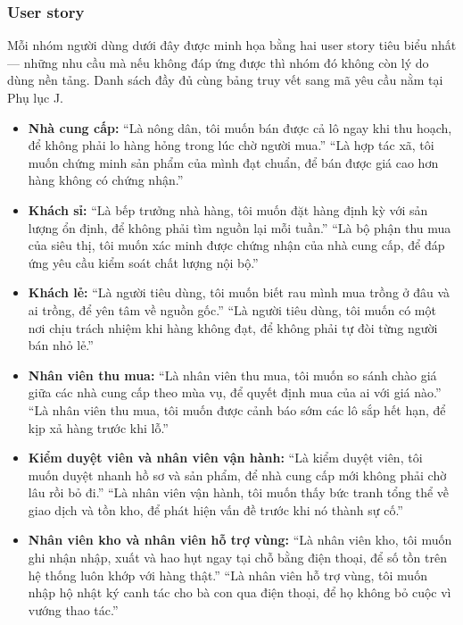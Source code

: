 \subsubsection*{User story}

Mỗi nhóm người dùng dưới đây được minh họa bằng hai user story tiêu biểu nhất --- những nhu cầu mà nếu không đáp ứng được thì nhóm đó không còn lý do dùng nền tảng. Danh sách đầy đủ cùng bảng truy vết sang mã yêu cầu nằm tại Phụ lục J.

\begin{itemize}
    \item \textbf{Nhà cung cấp:} ``Là nông dân, tôi muốn bán được cả lô ngay khi thu hoạch, để không phải lo hàng hỏng trong lúc chờ người mua.'' \quad ``Là hợp tác xã, tôi muốn chứng minh sản phẩm của mình đạt chuẩn, để bán được giá cao hơn hàng không có chứng nhận.''
    \item \textbf{Khách sỉ:} ``Là bếp trưởng nhà hàng, tôi muốn đặt hàng định kỳ với sản lượng ổn định, để không phải tìm nguồn lại mỗi tuần.'' \quad ``Là bộ phận thu mua của siêu thị, tôi muốn xác minh được chứng nhận của nhà cung cấp, để đáp ứng yêu cầu kiểm soát chất lượng nội bộ.''
    \item \textbf{Khách lẻ:} ``Là người tiêu dùng, tôi muốn biết rau mình mua trồng ở đâu và ai trồng, để yên tâm về nguồn gốc.'' \quad ``Là người tiêu dùng, tôi muốn có một nơi chịu trách nhiệm khi hàng không đạt, để không phải tự đòi từng người bán nhỏ lẻ.''
    \item \textbf{Nhân viên thu mua:} ``Là nhân viên thu mua, tôi muốn so sánh chào giá giữa các nhà cung cấp theo mùa vụ, để quyết định mua của ai với giá nào.'' \quad ``Là nhân viên thu mua, tôi muốn được cảnh báo sớm các lô sắp hết hạn, để kịp xả hàng trước khi lỗ.''
    \item \textbf{Kiểm duyệt viên và nhân viên vận hành:} ``Là kiểm duyệt viên, tôi muốn duyệt nhanh hồ sơ và sản phẩm, để nhà cung cấp mới không phải chờ lâu rồi bỏ đi.'' \quad ``Là nhân viên vận hành, tôi muốn thấy bức tranh tổng thể về giao dịch và tồn kho, để phát hiện vấn đề trước khi nó thành sự cố.''
    \item \textbf{Nhân viên kho và nhân viên hỗ trợ vùng:} ``Là nhân viên kho, tôi muốn ghi nhận nhập, xuất và hao hụt ngay tại chỗ bằng điện thoại, để số tồn trên hệ thống luôn khớp với hàng thật.'' \quad ``Là nhân viên hỗ trợ vùng, tôi muốn nhập hộ nhật ký canh tác cho bà con qua điện thoại, để họ không bỏ cuộc vì vướng thao tác.''
\end{itemize}

